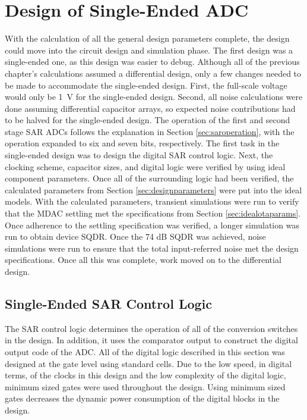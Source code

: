 \section{Design of Single-Ended ADC}
With the calculation of all the general design parameters complete, the design could move into the circuit design and simulation phase. The first design was a single-ended one, as this design was easier to debug. Although all of the previous chapter's calculations assumed a differential design, only a few changes needed to be made to accommodate the single-ended design. First, the full-scale voltage would only be \SI{1}{\volt} for the single-ended design. Second, all noise calculations were done assuming differential capacitor arrays, so expected noise contributions had to be halved for the single-ended design. The operation of the first and second stage SAR ADCs follows the explanation in Section \ref{sec:saroperation}, with the operation expanded to six and seven bits, respectively. The first task in the single-ended design was to design the digital SAR control logic. Next, the clocking scheme, capacitor sizes, and digital logic were verified by using ideal component parameters. Once all of the surrounding logic had been verified, the calculated parameters from Section \ref{sec:designparameters} were put into the ideal models. With the calculated parameters, transient simulations were run to verify that the MDAC settling met the specifications from Section \ref{sec:idealotaparams}. Once adherence to the settling specification was verified, a longer simulation was run to obtain device SQDR. Once the 74 dB SQDR was achieved, noise simulations were run to ensure that the total input-referred noise met the design specifications. Once all this was complete, work moved on to the differential design.
\subsection{Single-Ended SAR Control Logic}
The SAR control logic determines the operation of all of the conversion switches in the design. In addition, it uses the comparator output to construct the digital output code of the ADC. All of the digital logic described in this section was designed at the gate level using standard cells. Due to the low speed, in digital terms, of the clocks in this design and the low complexity of the digital logic, minimum sized gates were used throughout the design. Using minimum sized gates decreases the dynamic power consumption of the digital blocks in the design.

